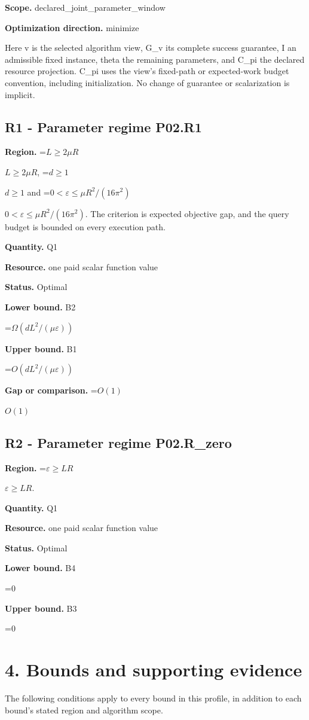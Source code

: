 \documentclass[10pt,a4paper]{article}
\newcommand{\AtlasMath}[1]{\par\begingroup\centering\setbox0=\hbox{$\displaystyle #1$}\ifdim\wd0>1.4\linewidth\typeout{ATLAS WIDE FORMULA: \the\wd0}\fi\ifdim\wd0>\linewidth\resizebox{\linewidth}{!}{\box0}\else\box0\fi\par\endgroup}
\newcommand{\AtlasInlineMath}[1]{\begingroup\setbox0=\hbox{$#1$}\ifdim\wd0>.4\linewidth\endgroup\AtlasMath{#1}\else\endgroup$#1$\fi}
\begin{document}
\textbf{Scope.} declared\_joint\_parameter\_window

\textbf{Optimization direction.} minimize

Here v is the selected algorithm view, G\_v its complete success guarantee, I an admissible fixed instance, theta the remaining parameters, and C\_pi the declared resource projection. C\_pi uses the view's fixed-path or expected-work budget convention, including initialization. No change of guarantee or scalarization is implicit.

\subsection{R1 - Parameter regime P02.R1}
\textbf{Region.} \AtlasInlineMath{L\ge2\mu R}, \AtlasInlineMath{d\ge1} and \AtlasInlineMath{0<\varepsilon\le\mu R^2/(16\pi^2)}. The criterion is expected objective gap, and the query budget is bounded on every execution path.

\textbf{Quantity.} Q1

\textbf{Resource.} one paid scalar function value

\textbf{Status.} Optimal

\textbf{Lower bound.} B2

\AtlasMath{\Omega(dL^2/(\mu\varepsilon))}
\textbf{Upper bound.} B1

\AtlasMath{O(dL^2/(\mu\varepsilon))}
\textbf{Gap or comparison.} \AtlasInlineMath{O(1)}

\subsection{R2 - Parameter regime P02.R\_zero}
\textbf{Region.} \AtlasInlineMath{\varepsilon\ge LR}.

\textbf{Quantity.} Q1

\textbf{Resource.} one paid scalar function value

\textbf{Status.} Optimal

\textbf{Lower bound.} B4

\AtlasMath{0}
\textbf{Upper bound.} B3

\AtlasMath{0}
\section{4. Bounds and supporting evidence}
The following conditions apply to every bound in this profile, in addition to each bound's stated region and algorithm scope.
\end{document}
